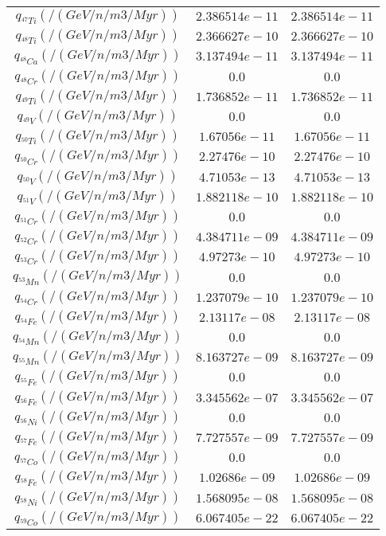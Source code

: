 \begin{tabular}{c |c |c}
	$q_{^{47}Ti} (/(GeV/n/m3/Myr))$ & $2.386514e-11$ &$2.386514e-11$ \\ 
	$q_{^{48}Ti} (/(GeV/n/m3/Myr))$ & $2.366627e-10$ &$2.366627e-10$ \\ 
	$q_{^{48}Ca} (/(GeV/n/m3/Myr))$ & $3.137494e-11$ &$3.137494e-11$ \\ 
	$q_{^{48}Cr} (/(GeV/n/m3/Myr))$ & $0.0$ &$0.0$ \\ 
	$q_{^{49}Ti} (/(GeV/n/m3/Myr))$ & $1.736852e-11$ &$1.736852e-11$ \\ 
	$q_{^{49}V} (/(GeV/n/m3/Myr))$ & $0.0$ &$0.0$ \\ 
	$q_{^{50}Ti} (/(GeV/n/m3/Myr))$ & $1.67056e-11$ &$1.67056e-11$ \\ 
	$q_{^{50}Cr} (/(GeV/n/m3/Myr))$ & $2.27476e-10$ &$2.27476e-10$ \\ 
	$q_{^{50}V} (/(GeV/n/m3/Myr))$ & $4.71053e-13$ &$4.71053e-13$ \\ 
	$q_{^{51}V} (/(GeV/n/m3/Myr))$ & $1.882118e-10$ &$1.882118e-10$ \\ 
	$q_{^{51}Cr} (/(GeV/n/m3/Myr))$ & $0.0$ &$0.0$ \\ 
	$q_{^{52}Cr} (/(GeV/n/m3/Myr))$ & $4.384711e-09$ &$4.384711e-09$ \\ 
	$q_{^{53}Cr} (/(GeV/n/m3/Myr))$ & $4.97273e-10$ &$4.97273e-10$ \\ 
	$q_{^{53}Mn} (/(GeV/n/m3/Myr))$ & $0.0$ &$0.0$ \\ 
	$q_{^{54}Cr} (/(GeV/n/m3/Myr))$ & $1.237079e-10$ &$1.237079e-10$ \\ 
	$q_{^{54}Fe} (/(GeV/n/m3/Myr))$ & $2.13117e-08$ &$2.13117e-08$ \\ 
	$q_{^{54}Mn} (/(GeV/n/m3/Myr))$ & $0.0$ &$0.0$ \\ 
	$q_{^{55}Mn} (/(GeV/n/m3/Myr))$ & $8.163727e-09$ &$8.163727e-09$ \\ 
	$q_{^{55}Fe} (/(GeV/n/m3/Myr))$ & $0.0$ &$0.0$ \\ 
	$q_{^{56}Fe} (/(GeV/n/m3/Myr))$ & $3.345562e-07$ &$3.345562e-07$ \\ 
	$q_{^{56}Ni} (/(GeV/n/m3/Myr))$ & $0.0$ &$0.0$ \\ 
	$q_{^{57}Fe} (/(GeV/n/m3/Myr))$ & $7.727557e-09$ &$7.727557e-09$ \\ 
	$q_{^{57}Co} (/(GeV/n/m3/Myr))$ & $0.0$ &$0.0$ \\ 
	$q_{^{58}Fe} (/(GeV/n/m3/Myr))$ & $1.02686e-09$ &$1.02686e-09$ \\ 
	$q_{^{58}Ni} (/(GeV/n/m3/Myr))$ & $1.568095e-08$ &$1.568095e-08$ \\ 
	$q_{^{59}Co} (/(GeV/n/m3/Myr))$ & $6.067405e-22$ &$6.067405e-22$ \\ 

\end{tabular}
